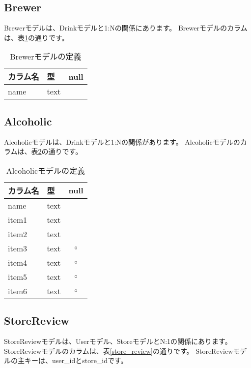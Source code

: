\documentclass[a4j,titlepage]{jarticle}
\begin{document}
\subsection{Brewer}
Brewerモデルは、Drinkモデルと1:Nの関係にあります。
Brewerモデルのカラムは、表\ref{brewer}の通りです。

\begin{table}[!htbp]
\caption{Brewerモデルの定義}
\label{brewer}
\small
\begin{center}
\begin{tabular}{|l|l|c|}\hline
カラム名 & 型 & null \\\hline\hline
name & text & \\\hline
\end{tabular}
\end{center}
\end{table}

\subsection{Alcoholic}
Alcoholicモデルは、Drinkモデルと1:Nの関係があります。
Alcoholicモデルのカラムは、表\ref{alcoholic}の通りです。

\begin{table}[!htbp]
\caption{Alcoholicモデルの定義}
\label{alcoholic}
\small
\begin{center}
\begin{tabular}{|l|l|c|}\hline
カラム名 & 型 & null \\\hline\hline
name & text &  \\\hline
item1 & text & \\\hline
item2 & text & \\\hline
item3 & text & $\circ$ \\\hline
item4 & text & $\circ$ \\\hline
item5 & text & $\circ$ \\\hline
item6 & text & $\circ$ \\\hline
\end{tabular}
\end{center}
\end{table}

\subsection{StoreReview}
StoreReviewモデルは、Userモデル、StoreモデルとN:1の関係にあります。
StoreReviewモデルのカラムは、表\ref{store_review}の通りです。
StoreReviewモデルの主キーは、user\_idとstore\_idです。
\end{document}
